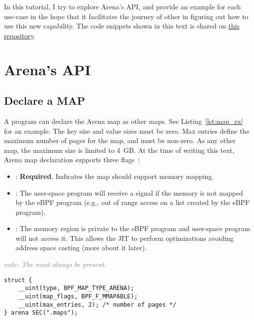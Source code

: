 \documentclass{article}
\begin{document}
In this tutorial, I try to explore Arena's API, and provide an example for each
use-case in the hope that it facilitates the journey of other in figuring out
how to use this new capability. The code snippets shown in this text is shared
on \href{https://github.com/bpf-endeavor/ebpf-arena-tutorial}{this repository}.

\section{Arena's API}

\subsection{Declare a MAP}
A program can declare the Arena map as other maps. See Listing~\ref{lst:map_ex}
for an example. The key size and value sizes must be zero. Max entries define
the maximum number of pages for the map, and must be non-zero. As any other
map, the maximum size is limited to 4~GB. At the time of writing this text,
Arena map declaration supports three flags~\cite{arena_source}:
\begin{itemize}
    \item {}: \textbf{Required}. Indicates the map should
        support memory mapping.
    \item {}: The user-space program will receive a
         signal if the memory is not mapped by the eBPF program
        (e.g., out of range access on a list created by the eBPF program).
    \item {}: The memory region is private to the eBPF
        program and user-space program will not access it. This allows the JIT
        to perform optimizations avoiding address space casting (more about it
        later).
\end{itemize}
\textcolor{gray}{\textit{note: The  must always be present.}}

\begin{minipage}{\linewidth}
\centering
\begin{flushleft}
\begin{lstlisting}[caption={Example of using Arena map.}, label={lst:map_ex}]
struct {
    __uint(type, BPF_MAP_TYPE_ARENA);
    __uint(map_flags, BPF_F_MMAPABLE);
    __uint(max_entries, 2); /* number of pages */
} arena SEC(".maps");
\end{lstlisting}
\end{flushleft}
\end{minipage}
\end{document}
